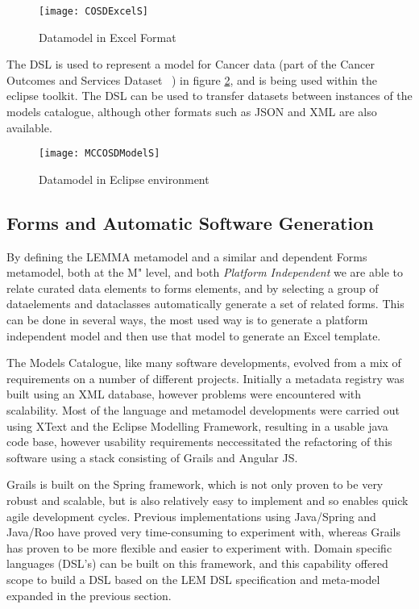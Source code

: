 \begin{figure}[here]
	\texttt{[image: COSDExcelS]}
	\caption{ Datamodel in Excel Format} 
	\label{fig:excelCOSD}
\end{figure}
The DSL is used to represent a model for Cancer data (part of the Cancer Outcomes and Services Dataset ~\cite{COSD}) in figure \ref{fig:elmcosd}, and is being used within the eclipse toolkit. The DSL can be used to transfer datasets between instances of the models catalogue, although other formats such as JSON and XML are also available.

\begin{figure}[here]
	\texttt{[image: MCCOSDModelS]}
	\caption{ Datamodel in Eclipse environment} 
	\label{fig:elmcosd}
\end{figure}

\subsection{Forms and Automatic Software Generation}

By defining the LEMMA metamodel and a similar and dependent Forms metamodel, both at the M" level, and both \emph{Platform Independent} we are able to relate curated data elements to forms elements, and by selecting a group of dataelements and dataclasses automatically generate a set of related forms. This can be done in several ways, the most used way is to generate a platform independent model and then use that model to generate an Excel template. 



The Models Catalogue, like many software developments, evolved from a mix of requirements on a number of different projects.  Initially a metadata registry was built using an XML database, however problems were encountered with scalability.  Most of the language and metamodel developments were carried out using XText and the Eclipse Modelling Framework, resulting in a usable java code base, however usability requirements neccessitated the refactoring of this software using a stack consisting of Grails and Angular JS. 

Grails is built on the Spring framework, which is not only proven to be very robust and scalable, but is also relatively easy to implement and so enables quick agile development cycles. Previous implementations using Java/Spring and Java/Roo have proved very time-consuming to experiment with, whereas Grails has proven to be more flexible and easier to experiment with.  Domain specific languages (DSL’s) can be  built on this framework, and this capability offered scope to build a DSL based on the LEM DSL specification and meta-model expanded in the previous section.
 
